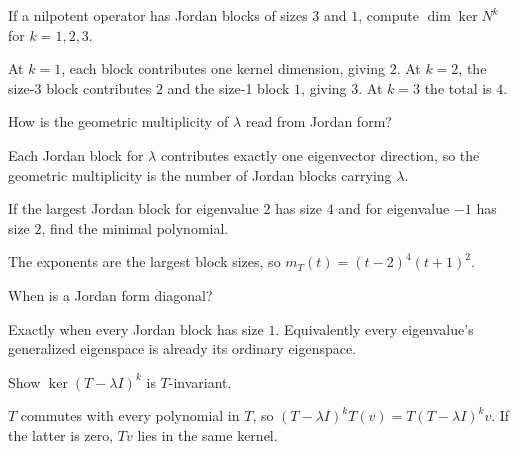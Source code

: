 \begin{problem}\label{prob:i12-problem-02}
If a nilpotent operator has Jordan blocks of sizes $3$ and $1$, compute $\dim\ker N^k$ for $k=1,2,3$.
\end{problem}
\begin{solution}
At $k=1$, each block contributes one kernel dimension, giving $2$. At $k=2$, the size-3 block contributes $2$ and the size-1 block $1$, giving $3$. At $k=3$ the total is $4$.
\end{solution}

\begin{problem}\label{prob:i12-problem-03}
How is the geometric multiplicity of $\lambda$ read from Jordan form?
\end{problem}
\begin{solution}
Each Jordan block for $\lambda$ contributes exactly one eigenvector direction, so the geometric multiplicity is the number of Jordan blocks carrying $\lambda$.
\end{solution}

\begin{problem}\label{prob:i12-problem-04}
If the largest Jordan block for eigenvalue $2$ has size $4$ and for eigenvalue $-1$ has size $2$, find the minimal polynomial.
\end{problem}
\begin{solution}
The exponents are the largest block sizes, so $m_T(t)=(t-2)^4(t+1)^2$.
\end{solution}

\begin{problem}\label{prob:i12-problem-05}
When is a Jordan form diagonal?
\end{problem}
\begin{solution}
Exactly when every Jordan block has size $1$. Equivalently every eigenvalue's generalized eigenspace is already its ordinary eigenspace.
\end{solution}

\begin{problem}\label{prob:i12-problem-06}
Show $\ker(T-\lambda I)^k$ is $T$-invariant.
\end{problem}
\begin{solution}
$T$ commutes with every polynomial in $T$, so $(T-\lambda I)^kT(v)=T(T-\lambda I)^kv$. If the latter is zero, $Tv$ lies in the same kernel.
\end{solution}

